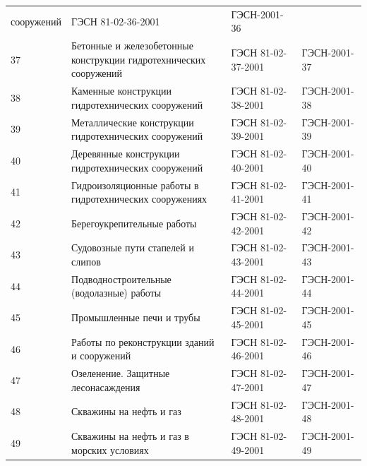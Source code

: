 \documentclass[a4paper,12pt]{article}
\begin{document}
\begin{longtable}[!hbp]{l p{5cm} p{5cm} p{3cm}}
        сооружений								& ГЭСН 81-02-36-2001 	& ГЭСН-2001-36\\ 
        37 	& Бетонные и железобетонные конструкции 
        гидротехнических сооружений				& ГЭСН 81-02-37-2001 	& ГЭСН-2001-37\\ 
        38 	& Каменные конструкции гидротехнических 
        сооружений								& ГЭСН 81-02-38-2001 	& ГЭСН-2001-38\\ 
        39 	& Металлические конструкции 
        гидротехнических сооружений				& ГЭСН 81-02-39-2001 	& ГЭСН-2001-39\\ 
        40 	& Деревянные конструкции гидротехнических 
        сооружений								& ГЭСН 81-02-40-2001 	& ГЭСН-2001-40\\ 
        41 	& Гидроизоляционные работы в 
        гидротехнических сооружениях			& ГЭСН 81-02-41-2001 	& ГЭСН-2001-41\\ 
        42 	& Берегоукрепительные работы				& ГЭСН 81-02-42-2001 	& ГЭСН-2001-42\\ 
        43 	& Судовозные пути стапелей и слипов			& ГЭСН 81-02-43-2001 	& ГЭСН-2001-43\\ 
        44 	& Подводностроительные (водолазные) работы	& ГЭСН 81-02-44-2001 	& ГЭСН-2001-44\\ 
        45 	& Промышленные печи и трубы					& ГЭСН 81-02-45-2001 	& ГЭСН-2001-45\\ 
        46 	& Работы по реконструкции зданий 
        и сооружений							& ГЭСН 81-02-46-2001 	& ГЭСН-2001-46\\ 
        47 	& Озеленение. Защитные лесонасаждения		& ГЭСН 81-02-47-2001 	& ГЭСН-2001-47\\ 
        48 	& Скважины на нефть и газ					& ГЭСН 81-02-48-2001 	& ГЭСН-2001-48\\ 
        49 	& Скважины на нефть и газ 
        в морских условиях						& ГЭСН 81-02-49-2001 	& ГЭСН-2001-49\\ 
    \end{longtable}	
\end{document}
